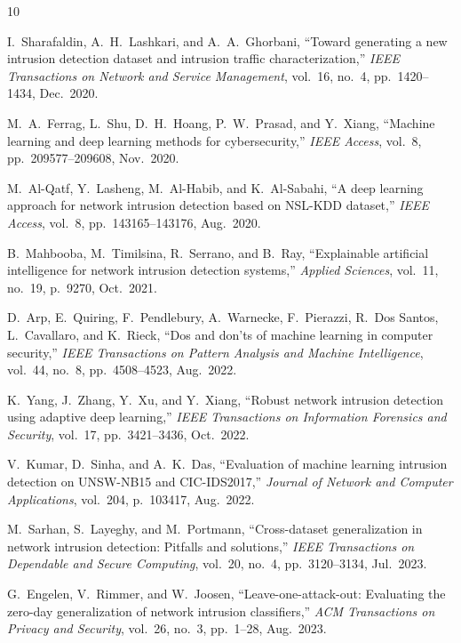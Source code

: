 \documentclass[conference,10pt,twocolumn]{IEEEtran}
\begin{document}
\balance
\begin{thebibliography}{10}

I.~Sharafaldin, A.~H.~Lashkari, and A.~A.~Ghorbani, ``Toward generating a new intrusion detection dataset and intrusion traffic characterization,'' \emph{IEEE Transactions on Network and Service Management}, vol.~16, no.~4, pp.~1420--1434, Dec.~2020.

M.~A.~Ferrag, L.~Shu, D.~H.~Hoang, P.~W.~Prasad, and Y.~Xiang, ``Machine learning and deep learning methods for cybersecurity,'' \emph{IEEE Access}, vol.~8, pp.~209577--209608, Nov.~2020.

M.~Al-Qatf, Y.~Lasheng, M.~Al-Habib, and K.~Al-Sabahi, ``A deep learning approach for network intrusion detection based on NSL-KDD dataset,'' \emph{IEEE Access}, vol.~8, pp.~143165--143176, Aug.~2020.

B.~Mahbooba, M.~Timilsina, R.~Serrano, and B.~Ray, ``Explainable artificial intelligence for network intrusion detection systems,'' \emph{Applied Sciences}, vol.~11, no.~19, p.~9270, Oct.~2021.

D.~Arp, E.~Quiring, F.~Pendlebury, A.~Warnecke, F.~Pierazzi, R.~Dos Santos, L.~Cavallaro, and K.~Rieck, ``Dos and don'ts of machine learning in computer security,'' \emph{IEEE Transactions on Pattern Analysis and Machine Intelligence}, vol.~44, no.~8, pp.~4508--4523, Aug.~2022.

K.~Yang, J.~Zhang, Y.~Xu, and Y.~Xiang, ``Robust network intrusion detection using adaptive deep learning,'' \emph{IEEE Transactions on Information Forensics and Security}, vol.~17, pp.~3421--3436, Oct.~2022.

V.~Kumar, D.~Sinha, and A.~K.~Das, ``Evaluation of machine learning intrusion detection on UNSW-NB15 and CIC-IDS2017,'' \emph{Journal of Network and Computer Applications}, vol.~204, p.~103417, Aug.~2022.

M.~Sarhan, S.~Layeghy, and M.~Portmann, ``Cross-dataset generalization in network intrusion detection: Pitfalls and solutions,'' \emph{IEEE Transactions on Dependable and Secure Computing}, vol.~20, no.~4, pp.~3120--3134, Jul.~2023.

G.~Engelen, V.~Rimmer, and W.~Joosen, ``Leave-one-attack-out: Evaluating the zero-day generalization of network intrusion classifiers,'' \emph{ACM Transactions on Privacy and Security}, vol.~26, no.~3, pp.~1--28, Aug.~2023.


\end{thebibliography}
\end{document}
